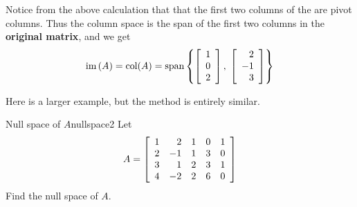 \begin{solution}
Notice from the above calculation that that the first two columns of the {\rref} are pivot
columns. Thus the  column space is the span of the first two  columns in
the \textbf{original matrix}, and we get 
\begin{equation*}
\mbox{im}\left( A\right) = \mbox{col}(A) =
\mbox{span} \left\{ \left[ 
\begin{array}{r}
1 \\ 
0 \\ 
2 
\end{array}
\right], \; \left[ 
\begin{array}{r}
2 \\ 
-1 \\ 
3 
\end{array}
\right]  \right\}
\end{equation*}

\end{solution}

Here is a larger example, but the method is entirely similar.

\begin{example}{Null space of $A$}{nullspace2}
Let
\begin{equation*}
A=\left[
\begin{array}{rrrrr}
1 & 2 & 1 & 0 & 1 \\
2 & -1 & 1 & 3 & 0 \\
3 & 1 & 2 & 3 & 1 \\
4 & -2 & 2 & 6 & 0
\end{array}
\right]
\end{equation*}
Find the null space of $A$.
\end{example}

